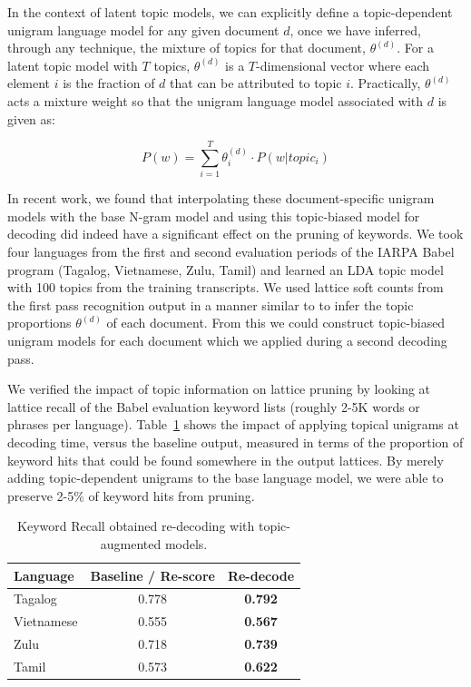 In the context of latent topic models, we can explicitly define a topic-dependent unigram language model for any given document $d$, once we have inferred, through any technique, the mixture of topics for that document, $\theta^{(d)}$.   For a latent topic model with $T$ topics, $\theta^{(d)}$ is a $T$-dimensional vector where each element $i$ is the fraction of $d$ that can be attributed to topic $i$.  Practically, $\theta^{(d)}$ acts a mixture weight so that the unigram language model associated with $d$ is given as:

\begin{equation}
P(w) = \sum_{i=1}^T\theta^{(d)}_i \cdot P(w|topic_i)
\end{equation}

In recent work, we found that interpolating these document-specific unigram models with the base N-gram model and using this topic-biased model for decoding did indeed have a significant effect on the pruning of keywords.   We took four languages from the first and second evaluation periods of the IARPA Babel program \cite{babel} (Tagalog, Vietnamese, Zulu, Tamil) and learned an LDA topic model with 100 topics from the training transcripts.  We used  lattice soft counts from the first pass recognition output in a manner similar to \cite{liu2008} to infer the topic proportions $\theta^{(d)}$ of each document.  From this we could construct topic-biased unigram models for each document which we applied during a second decoding pass.

We verified the impact of topic information on lattice pruning by looking at lattice recall of the Babel evaluation keyword lists (roughly 2-5K words or phrases per language).  Table~\ref{latticeRecall} shows the impact of applying topical unigrams at decoding time, versus the baseline output, measured in terms of the proportion of keyword hits that could be found somewhere in the output lattices.  By merely adding topic-dependent unigrams to the base language model, we were able to preserve 2-5\% of keyword hits from pruning\cite{wintrode2014slta}.

\begin{table}[ht]
\centering
   \begin{tabular}{lcc}
   \textbf{Language} & \textbf{Baseline / Re-score}& \textbf{Re-decode} \\ \midrule
        Tagalog &  0.778 & \textbf{0.792}\\
        Vietnamese & 0.555 & \textbf{0.567}\\
        Zulu &  0.718 & \textbf{0.739}\\
        Tamil &  0.573 & \textbf{0.622}\\ \bottomrule
	\end{tabular}
      \caption[Keyword recall obtained re-decoding with topic-augmented models]{Keyword Recall obtained re-decoding with topic-augmented models.\label{latticeRecall}}
\end{table}

